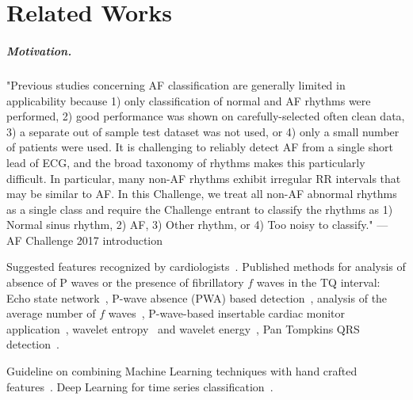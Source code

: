 \chapter{Related Works}

\paragraph{Motivation.}
"Previous studies concerning AF classification are generally limited in applicability because 1) only classification of normal and AF rhythms were performed, 2) good performance was shown on carefully-selected often clean data, 3) a separate out of sample test dataset was not used, or 4) only a small number of patients were used. It is challenging to reliably detect AF from a single short lead of ECG, and the broad taxonomy of rhythms makes this particularly difficult. In particular, many non-AF rhythms exhibit irregular RR intervals that may be similar to AF. In this Challenge, we treat all non-AF abnormal rhythms as a single class and require the Challenge entrant to classify the rhythms as 1) Normal sinus rhythm, 2) AF, 3) Other rhythm, or 4) Too noisy to classify." --- AF Challenge 2017 introduction

Suggested features recognized by cardiologists~\cite{reiffel2010practice}.
Published methods for analysis of absence of P waves or the presence of fibrillatory $f$ waves in the TQ interval:
Echo state network~\cite{petrenas2012echo},
P-wave absence (PWA) based detection~\cite{ladavich2015rate},
analysis of the average number of $f$ waves~\cite{du2014novel},
P-wave-based insertable cardiac monitor application~\cite{purerfellner2014p},
wavelet entropy~\cite{alcaraz2006wavelet, rodenas2015wavelet} and wavelet energy~\cite{garcia2016application},
Pan Tompkins QRS detection~\cite{waser2013removing}.

Guideline on combining Machine Learning techniques with hand crafted features~\cite{geurts2001pattern}.
Deep Learning for time series classification~\cite{langkvist2014review, wang2016time}.
